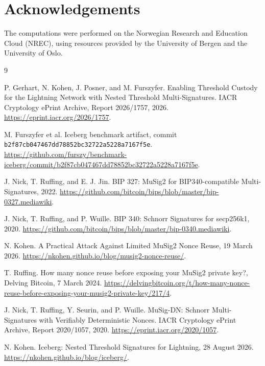 \documentclass[10pt,a4paper]{article}
\begin{document}
\section*{Acknowledgements}

The computations were performed on the Norwegian Research and Education Cloud (NREC), using resources provided by the University of Bergen and the University of Oslo.

\begin{thebibliography}{9}

P. Gerhart, N. Kohen, J. Posner, and M. Furszyfer.
\newblock Enabling Threshold Custody for the Lightning Network with Nested
Threshold Multi-Signatures.
\newblock IACR Cryptology ePrint Archive, Report 2026/1757, 2026.
\newblock \url{https://eprint.iacr.org/2026/1757}.

M. Furszyfer et al.
\newblock Iceberg benchmark artifact, commit
\texttt{b2f87cb047467dd78852bc32722a5228a7167f5e}.
\newblock \url{https://github.com/furszy/benchmark-iceberg/commit/b2f87cb047467dd78852bc32722a5228a7167f5e}.

J. Nick, T. Ruffing, and E. J. Jin.
\newblock BIP 327: MuSig2 for BIP340-compatible Multi-Signatures, 2022.
\newblock \url{https://github.com/bitcoin/bips/blob/master/bip-0327.mediawiki}.

J. Nick, T. Ruffing, and P. Wuille.
\newblock BIP 340: Schnorr Signatures for secp256k1, 2020.
\newblock \url{https://github.com/bitcoin/bips/blob/master/bip-0340.mediawiki}.

N. Kohen.
\newblock A Practical Attack Against Limited MuSig2 Nonce Reuse, 19 March
2026.
\newblock \url{https://nkohen.github.io/blog/musig2-nonce-reuse/}.

T. Ruffing.
\newblock How many nonce reuse before exposing your MuSig2 private key?,
Delving Bitcoin, 7 March 2024.
\newblock \url{https://delvingbitcoin.org/t/how-many-nonce-reuse-before-exposing-your-musig2-private-key/217/4}.

J. Nick, T. Ruffing, Y. Seurin, and P. Wuille.
\newblock MuSig-DN: Schnorr Multi-Signatures with Verifiably Deterministic
Nonces.
\newblock IACR Cryptology ePrint Archive, Report 2020/1057, 2020.
\newblock \url{https://eprint.iacr.org/2020/1057}.

N. Kohen.
\newblock Iceberg: Nested Threshold Signatures for Lightning, 28 August 2026.
\newblock \url{https://nkohen.github.io/blog/iceberg/}.

\end{thebibliography}
\end{document}
